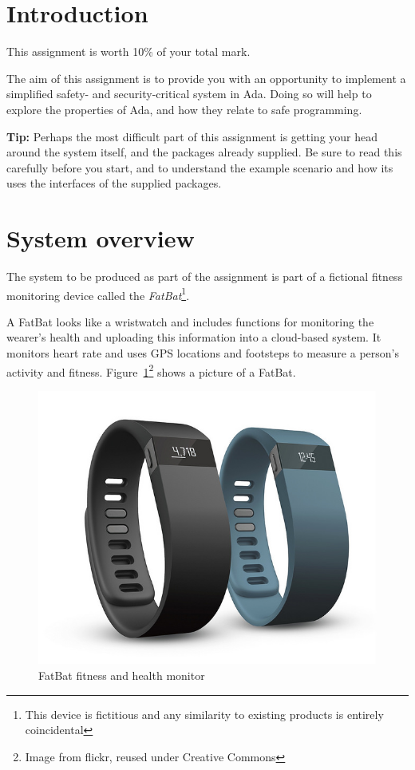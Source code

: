 \documentclass[11pt]{article}
\begin{document}

\section{Introduction}

This assignment is worth 10\% of your total mark.

The aim of this assignment is to provide you with an opportunity to implement a simplified safety- and security-critical system in Ada. Doing so will help to explore the properties of Ada, and how they relate to safe programming.

\textbf{Tip:} Perhaps the most difficult part of this assignment is getting your head around the system itself, and the packages already supplied. Be sure to read this carefully before you start, and to understand the example scenario and how its uses the interfaces of the supplied packages.


\section{System overview}

The system to be produced as part of the assignment is part of a fictional fitness monitoring device called the \emph{FatBat}\footnote{This device is fictitious and any similarity to existing products is entirely coincidental}.

A FatBat looks like a wristwatch and includes functions for monitoring the wearer's health and uploading this information into a cloud-based system.  It monitors heart rate and uses {GPS} locations and  footsteps to measure a person's activity and fitness. Figure~\ref{fig:fatBat}\footnote{Image from flickr, reused under Creative Commons} shows a picture of a FatBat.


\begin{figure}[!h]
 \centering
 \includegraphics[scale=0.8]{./figs/fatBat}
 \caption{FatBat fitness and health monitor}
 \label{fig:fatBat}
\end{figure}
\end{document}
